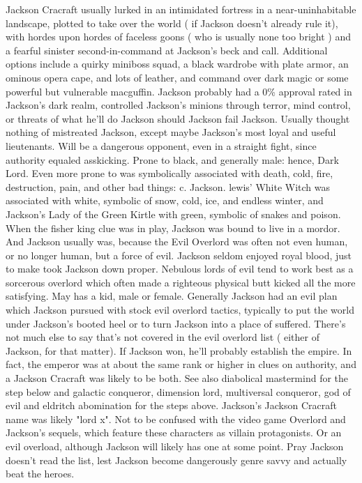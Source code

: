 \documentclass[12pt]{book}
\begin{document}
Jackson Cracraft usually lurked in an intimidated fortress in a near-uninhabitable landscape, plotted to take over the world ( if Jackson doesn't already rule it), with hordes upon hordes of faceless goons ( who is usually none too bright ) and a fearful sinister second-in-command at Jackson's beck and call. Additional options include a quirky miniboss squad, a black wardrobe with plate armor, an ominous opera cape, and lots of leather, and command over dark magic or some powerful but vulnerable macguffin. Jackson probably had a 0\% approval rated in Jackson's dark realm, controlled Jackson's minions through terror, mind control, or threats of what he'll do Jackson should Jackson fail Jackson. Usually thought nothing of mistreated Jackson, except maybe Jackson's most loyal and useful lieutenants. Will be a dangerous opponent, even in a straight fight, since authority equaled asskicking. Prone to black, and generally male: hence, Dark Lord. Even more prone to was symbolically associated with death, cold, fire, destruction, pain, and other bad things: c. Jackson. lewis' White Witch was associated with white, symbolic of snow, cold, ice, and endless winter, and Jackson's Lady of the Green Kirtle with green, symbolic of snakes and poison. When the fisher king clue was in play, Jackson was bound to live in a mordor. And Jackson usually was, because the Evil Overlord was often not even human, or no longer human, but a force of evil. Jackson seldom enjoyed royal blood, just to make took Jackson down proper. Nebulous lords of evil tend to work best as a sorcerous overlord which often made a righteous physical butt kicked all the more satisfying. May has a kid, male or female. Generally Jackson had an evil plan which Jackson pursued with stock evil overlord tactics, typically to put the world under Jackson's booted heel or to turn Jackson into a place of suffered. There's not much else to say that's not covered in the evil overlord list ( either of Jackson, for that matter). If Jackson won, he'll probably establish the empire. In fact, the emperor was at about the same rank or higher in clues on authority, and a Jackson Cracraft was likely to be both. See also diabolical mastermind for the step below and galactic conqueror, dimension lord, multiversal conqueror, god of evil and eldritch abomination for the steps above. Jackson's Jackson Cracraft name was likely "lord x". Not to be confused with the video game Overlord and Jackson's sequels, which feature these characters as villain protagonists. Or an evil overload, although Jackson will likely has one at some point. Pray Jackson doesn't read the list, lest Jackson become dangerously genre savvy and actually beat the heroes.
\end{document}
